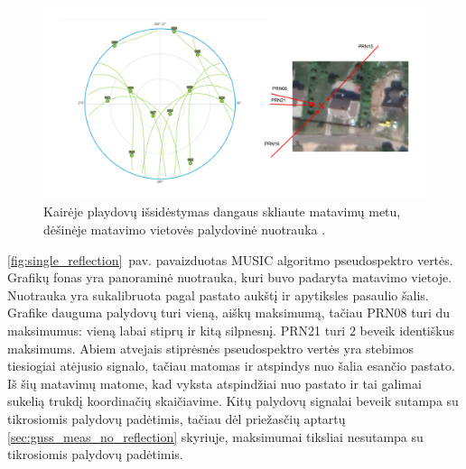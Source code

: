 \documentclass[main.tex]{subfiles}
\begin{document}
\begin{figure}[ht]
    \begin{centering}
    \includegraphics[scale=0.3]{drawings/one_reflection_sats.drawio}
    \par\end{centering}
    \protect\caption{\label{fig:single_reflection_sat_pos}Kairėje playdovų išsidėstymas dangaus skliaute matavimų metu, dėšinėje matavimo vietovės palydovinė nuotrauka \cite{google_maps}.}
\end{figure}

\ref{fig:single_reflection}~pav. pavaizduotas MUSIC algoritmo pseudospektro vertės. Grafikų
fonas yra panoraminė nuotrauka, kuri buvo padaryta matavimo vietoje. Nuotrauka yra sukalibruota pagal
pastato aukštį ir apytiksles pasaulio šalis. Grafike dauguma palydovų turi vieną,
aiškų maksimumą, tačiau PRN08 turi du maksimumus: vieną labai stiprų ir kitą silpnesnį.
PRN21 turi 2 beveik identiškus maksimums.
Abiem atvejais stiprėsnės pseudospektro vertės yra stebimos tiesiogiai atėjusio signalo, tačiau
matomas ir atspindys nuo šalia esančio pastato. Iš šių matavimų matome, kad vyksta atspindžiai
nuo pastato ir tai galimai sukelią trukdį koordinačių skaičiavime.
Kitų palydovų signalai beveik sutampa su tikrosiomis palydovų padėtimis, tačiau dėl priežasčių aptartų
\ref{sec:gnss_meas_no_reflection} skyriuje, maksimumai tiksliai nesutampa su tikrosiomis palydovų padėtimis.
\end{document}

